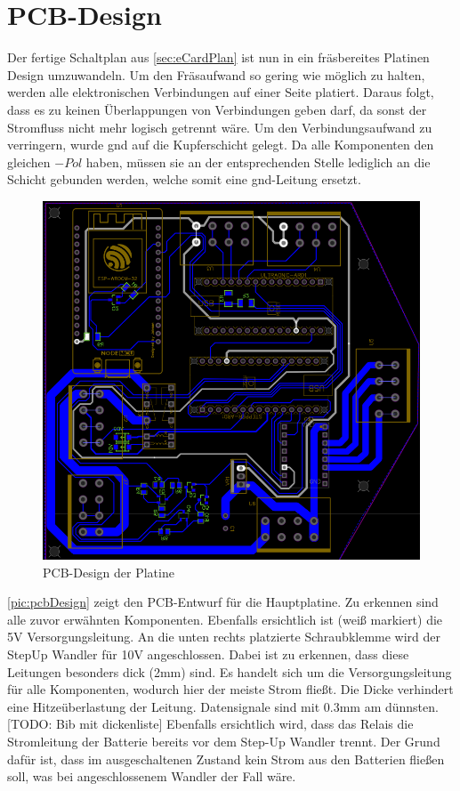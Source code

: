 \section{PCB-Design}
Der fertige Schaltplan aus \autoref{sec:eCardPlan} ist nun in ein fräsbereites Platinen Design umzuwandeln. Um den Fräsaufwand so gering wie möglich zu halten, werden alle elektronischen Verbindungen auf einer Seite platiert. Daraus folgt, dass es zu keinen Überlappungen von Verbindungen geben darf, da sonst der Stromfluss nicht mehr logisch getrennt wäre. Um den Verbindungsaufwand zu verringern, wurde \gls{gnd} auf die Kupferschicht gelegt. Da alle Komponenten den gleichen $-Pol$ haben, müssen sie an der entsprechenden Stelle lediglich an die Schicht gebunden werden, welche somit eine \gls{gnd}-Leitung ersetzt.
\vspace{0.5cm}
\begin{figure}[h]
	\begin{center}
		\includegraphics[width = 12cm]{pcbDesign.png}
		\caption{\label{pic:pcbDesign} PCB-Design der Platine}
	\end{center}
\end{figure}

\autoref{pic:pcbDesign} zeigt den PCB-Entwurf für die Hauptplatine. Zu erkennen sind alle zuvor erwähnten Komponenten. Ebenfalls ersichtlich ist (weiß markiert) die 5V Versorgungsleitung. An die unten rechts platzierte Schraubklemme wird der StepUp Wandler für 10V angeschlossen. Dabei ist zu erkennen, dass diese Leitungen besonders dick (2mm) sind. Es handelt sich um die Versorgungsleitung für alle Komponenten, wodurch hier der meiste Strom fließt. Die Dicke verhindert eine Hitzeüberlastung der Leitung. Datensignale sind mit 0.3mm am dünnsten.[TODO: Bib mit dickenliste]
Ebenfalls ersichtlich wird, dass das Relais die Stromleitung der Batterie bereits vor dem Step-Up Wandler trennt. Der Grund dafür ist, dass im ausgeschaltenen Zustand kein Strom aus den Batterien fließen soll, was bei angeschlossenem Wandler der Fall wäre. 


